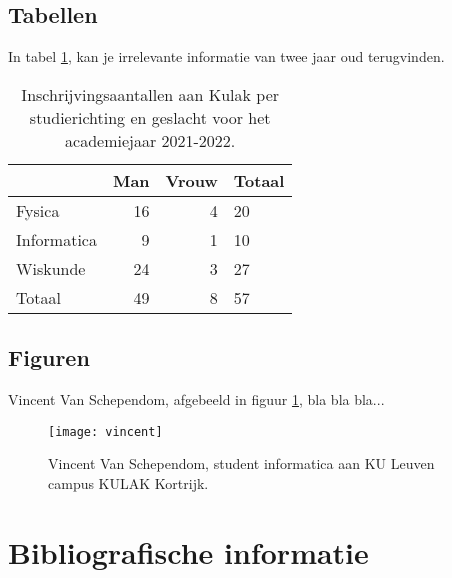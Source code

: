 \documentclass{book}
\begin{document}
	\subsection{Tabellen}
	
	In tabel \ref{tabel:inschrijvingen}, kan je irrelevante informatie van twee jaar oud terugvinden.
	
	\begin{table}
		\centering
			\begin{tabular}{l | r r | l}
			& Man & Vrouw & Totaal  \\ \hline
			Fysica      & 16  & 4     & 20 \\
			Informatica & 9   & 1     & 10 \\
			Wiskunde    & 24  & 3     & 27 \\ \hline
			Totaal      & 49  & 8     & 57
		\end{tabular}
		\caption{Inschrijvingsaantallen aan Kulak per studierichting en geslacht voor het academiejaar 2021-2022.}
		\label{tabel:inschrijvingen}
	\end{table}
	
	\subsection{Figuren}
	
	Vincent Van Schependom, afgebeeld in figuur \ref{fig:vincent}, bla bla bla...
	
	\begin{figure}
	\centering
	\texttt{[image: vincent]}
	\caption{Vincent Van Schependom, student informatica aan KU Leuven campus KULAK Kortrijk.}
	\label{fig:vincent}
	\end{figure}
	
	\section{Bibliografische informatie}
	
\end{document}
